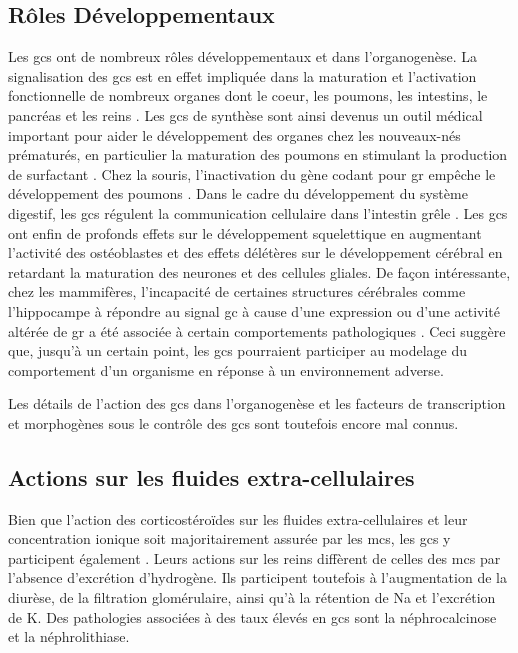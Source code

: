 \documentclass[../main.tex]{subfiles}
\begin{document}
	\subsection{Rôles Développementaux}
		Les \glspl{gc} ont de nombreux rôles développementaux et dans l'organogenèse.
		La signalisation des \glspl{gc} est en effet impliquée dans la maturation et l'activation fonctionnelle de nombreux organes dont le coeur, les poumons, les intestins, le pancréas et les reins \citep{Majumdar1985,Liggins1994,Pierce1995,Gesina2004}.
		Les \glspl{gc} de synthèse sont ainsi devenus un outil médical important pour aider le développement des organes chez les nouveaux-nés prématurés, en particulier la maturation des poumons \citep{Becker2001} en stimulant la production de surfactant \citep{Bolt2001}.
		Chez la souris, l'inactivation du gène codant pour \gls{gr} empêche le développement des poumons \citep{Cole2001}.
		Dans le cadre du développement du système digestif, les \glspl{gc} régulent la communication cellulaire dans l'intestin grêle \citep{Schaeffer2000}.
		Les \glspl{gc} ont enfin de profonds effets sur le développement squelettique en augmentant l'activité des ostéoblastes et des effets délétères sur le développement cérébral en retardant la maturation des neurones et des cellules gliales.
		De façon intéressante, chez les mammifères, l'incapacité de certaines structures cérébrales comme l'hippocampe à répondre au signal \gls{gc} à cause d'une expression ou d'une activité altérée de \gls{gr} a été associée à certain comportements pathologiques \citep{Liu1997,McGowan2009,Zhang2013}.
		Ceci suggère que, jusqu'à un certain point, les \glspl{gc} pourraient participer au modelage du comportement d'un organisme en réponse à un environnement adverse.
		\par
		Les détails de l'action des \glspl{gc} dans l'organogenèse et les facteurs de transcription et morphogènes sous le contrôle des \glspl{gc} sont toutefois encore mal connus.


	\subsection{Actions sur les fluides extra-cellulaires}
		Bien que l'action des corticostéroïdes sur les fluides extra-cellulaires et leur concentration ionique soit majoritairement assurée par les \glspl{mc}, les \glspl{gc} y participent également \citep{McKay2003}.
		Leurs actions sur les reins diffèrent de celles des \glspl{mc} par l'absence d'excrétion d'hydrogène.
		Ils participent toutefois à l'augmentation de la diurèse, de la filtration glomérulaire, ainsi qu'à la rétention de \gls{Na} et l'excrétion de \gls{K}.
		Des pathologies associées à des taux élevés en \glspl{gc} sont la néphrocalcinose et la néphrolithiase.
\end{document}
